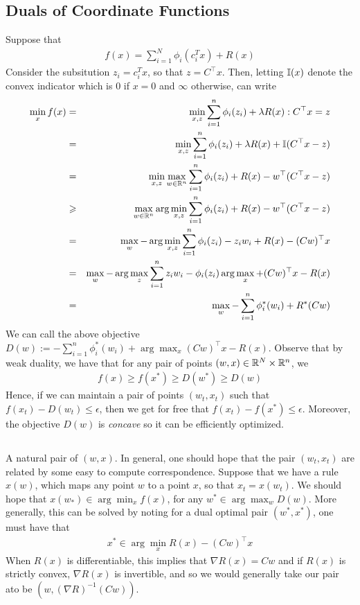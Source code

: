 \subsection{Duals of Coordinate Functions}
Suppose that 
\begin{eqnarray}
f(x) = \sum_{i=1}^N \phi_i(c_i^Tx) + R(x)
\end{eqnarray}
Consider the subsitution $z_i = c_i^Tx$, so that $z = C^\top x$. Then, letting $\mathbb I(x)$ denote the convex indicator which is $0$ if $x = 0$ and $\infty$ otherwise, can write 
\begin{eqnarray*}
\min_{x}f(x) &=&  \min_{x,z}  \sum_{i=1}^n \phi_i(z_i) + \lambda R(x) : C^\top x = z \\
&=&  \min_{x,z}  \sum_{i=1}^n \phi_i(z_i) + \lambda R(x) +  \mathbb I(C^\top x - z) \\
&=&  \min_{x,z}  \max_{w \in \mathbb{R}^n} \sum_{i=1}^n \phi_i(z_i) +  R(x) - w^{\top}(C^\top x - z ) \\
&\geqslant&   \max_{w \in \mathbb{R}^n} \arg\min_{x,z} \sum_{i=1}^n \phi_i(z_i) +  R(x) - w^{\top}(C^\top x - z ) \\
&=&   \max_{w} -\arg\min_{x,z} \sum_{i=1}^n \phi_i(z_i) - z_iw_i + R(x) - (Cw)^{\top} x \\
&=&   \max_{w} -\arg\max_{z} \sum_{i=1}^n z_iw_i -  \phi_i(z_i)  \arg\max_{x}+ (Cw)^{\top} x - R(x) \\
&=&   \max_{w} - \sum_{i=1}^n \phi_i^*(w_i) +  R^*(Cw) \\
\end{eqnarray*}
We can call the above objective $D(w):= - \sum_{i=1}^n \phi_i^*(w_i) +  \arg\max_{x} (Cw)^{\top} x - R(x)$. Observe that by weak duality, we have that for any pair of points $(w,x) \in \mathbb{R}^N \times \mathbb{R}^n$, we
\begin{eqnarray}
f(x) \ge f(x^*) \ge D(w^*) \ge D(w)
\end{eqnarray}
Hence, if we can maintain a pair of points $(w_t,x_t)$ such that $f(x_t) - D(w_t) \le \epsilon$, then we get for free that $f(x_t) - f(x^*) \le \epsilon$. Moreover, the objective $D(w)$ is \emph{concave} so it can be efficiently optimized.
\subsection{}
A natural pair of $(w,x)$. In general, one should hope that the pair $(w_t,x_t)$ are related by some easy to compute correspondence. Suppose that we have a rule $x(w)$, which maps any point $w$ to a point $x$, so that $x_t = x(w_t)$. We should hope that $x(w_*) \in \arg\min_{x} f(x)$, for any $w^* \in \arg\max_w D(w)$. More generally, this can be solved by noting for a dual optimal pair $(w^*,x^*)$, one must have that 
\begin{eqnarray}
x^* \in \arg\min_{x} R(x) - (Cw)^{\top}x
\end{eqnarray}
When $R(x)$ is differentiable, this implies that $\nabla R(x) = Cw$ and if $R(x)$ is strictly convex, $\nabla R(x)$ is invertible, and so we would generally take our pair ato be $(w,(\nabla R)^{-1}(Cw))$. 

